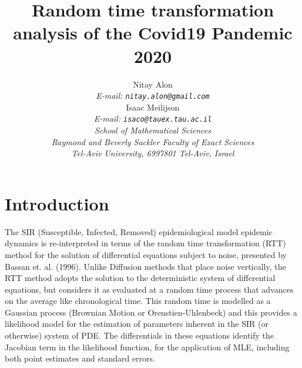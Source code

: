 \documentclass{article}
\begin{document}
\title {Random time transformation analysis of the Covid19 Pandemic 2020}

\author {
Nitay Alon
\\
{\em E-mail: \tt{nitay.alon@gmail.com}} \\
Isaac Meilijson
\\
{\em E-mail: \tt{isaco@tauex.tau.ac.il}} \\
{\em School of Mathematical Sciences} \\
{\em Raymond and Beverly Sackler Faculty of Exact Sciences} \\
{\em Tel-Aviv University, 6997801 Tel-Aviv, Israel} \\
}


\maketitle


\begin{abstract}


%
\end{abstract}





\section{Introduction} \label{introduction}

The SIR (Susceptible, Infected, Removed) epidemiological model epidemic dynamics is re-interpreted in terms of the random time transformation (RTT) method for the solution of differential equations subject to noise, presented by Bassan et. al. (1996). Unlike Diffusion methods that place noise vertically, the RTT method adopts the solution to the deterministic system of differential equations, but considers it as evaluated at a random time process that advances on the average like chronological time. This random time is modelled as a Gaussian process (Brownian Motion or Orenstien-Uhlenbeck) and this provides a likelihood model for the estimation of parameters inherent in the SIR (or otherwise) system of PDE. The differentials in these equations identify the Jacobian term in the likelihood function, for the application of MLE, including both point estimates and standard errors.
\end{document}
